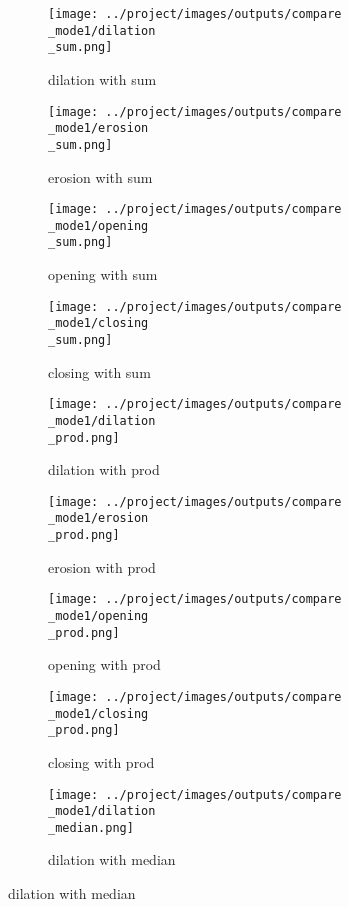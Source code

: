 \begin{figure}[!ht]
   \centering
\begin{subfigure}[t]{0.22\textwidth}
    \texttt{[image: ../project/images/outputs/compare\\\_mode1/dilation\\\_sum.png]}
    \caption{dilation with sum}
    \centering
  \end{subfigure}
\begin{subfigure}[t]{0.22\textwidth}
    \texttt{[image: ../project/images/outputs/compare\\\_mode1/erosion\\\_sum.png]}
    \caption{erosion with sum}
    \centering
  \end{subfigure}
\begin{subfigure}[t]{0.22\textwidth}
    \texttt{[image: ../project/images/outputs/compare\\\_mode1/opening\\\_sum.png]}
    \caption{opening with sum}
    \centering
  \end{subfigure}
\begin{subfigure}[t]{0.22\textwidth}
    \texttt{[image: ../project/images/outputs/compare\\\_mode1/closing\\\_sum.png]}
    \caption{closing with sum}
    \centering
  \end{subfigure}
\begin{subfigure}[t]{0.22\textwidth}
    \texttt{[image: ../project/images/outputs/compare\\\_mode1/dilation\\\_prod.png]}
    \caption{dilation with prod}
    \centering
  \end{subfigure}
\begin{subfigure}[t]{0.22\textwidth}
    \texttt{[image: ../project/images/outputs/compare\\\_mode1/erosion\\\_prod.png]}
    \caption{erosion with prod}
    \centering
  \end{subfigure}
\begin{subfigure}[t]{0.22\textwidth}
    \texttt{[image: ../project/images/outputs/compare\\\_mode1/opening\\\_prod.png]}
    \caption{opening with prod}
    \centering
  \end{subfigure}
\begin{subfigure}[t]{0.22\textwidth}
    \texttt{[image: ../project/images/outputs/compare\\\_mode1/closing\\\_prod.png]}
    \caption{closing with prod}
    \centering
  \end{subfigure}
\begin{subfigure}[t]{0.22\textwidth}
    \texttt{[image: ../project/images/outputs/compare\\\_mode1/dilation\\\_median.png]}
    \caption{dilation with median}
    \centering
  \end{subfigure}

\end{figure}
